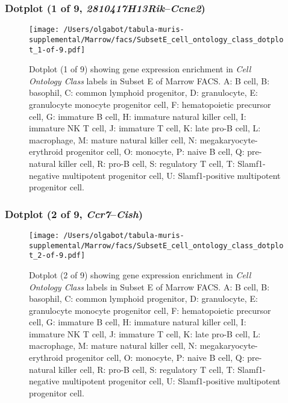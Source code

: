 \subsubsection{Dotplot (1 of 9, \emph{2810417H13Rik}--\emph{Ccne2})}
\begin{figure}[h]
\centering
\texttt{[image: /Users/olgabot/tabula-muris-supplemental/Marrow/facs/SubsetE\_cell\_ontology\_class\_dotplot\_1-of-9.pdf]}

\caption{ Dotplot (1 of 9)  showing gene expression enrichment in \emph{Cell Ontology Class} labels in Subset E of Marrow FACS. A: B cell, B: basophil, C: common lymphoid progenitor, D: granulocyte, E: granulocyte monocyte progenitor cell, F: hematopoietic precursor cell, G: immature B cell, H: immature natural killer cell, I: immature NK T cell, J: immature T cell, K: late pro-B cell, L: macrophage, M: mature natural killer cell, N: megakaryocyte-erythroid progenitor cell, O: monocyte, P: naive B cell, Q: pre-natural killer cell, R: pro-B cell, S: regulatory T cell, T: Slamf1-negative multipotent progenitor cell, U: Slamf1-positive multipotent progenitor cell.}
\end{figure}


\clearpage

\subsubsection{Dotplot (2 of 9, \emph{Ccr7}--\emph{Cish})}
\begin{figure}[h]
\centering
\texttt{[image: /Users/olgabot/tabula-muris-supplemental/Marrow/facs/SubsetE\_cell\_ontology\_class\_dotplot\_2-of-9.pdf]}

\caption{ Dotplot (2 of 9)  showing gene expression enrichment in \emph{Cell Ontology Class} labels in Subset E of Marrow FACS. A: B cell, B: basophil, C: common lymphoid progenitor, D: granulocyte, E: granulocyte monocyte progenitor cell, F: hematopoietic precursor cell, G: immature B cell, H: immature natural killer cell, I: immature NK T cell, J: immature T cell, K: late pro-B cell, L: macrophage, M: mature natural killer cell, N: megakaryocyte-erythroid progenitor cell, O: monocyte, P: naive B cell, Q: pre-natural killer cell, R: pro-B cell, S: regulatory T cell, T: Slamf1-negative multipotent progenitor cell, U: Slamf1-positive multipotent progenitor cell.}
\end{figure}


\clearpage

